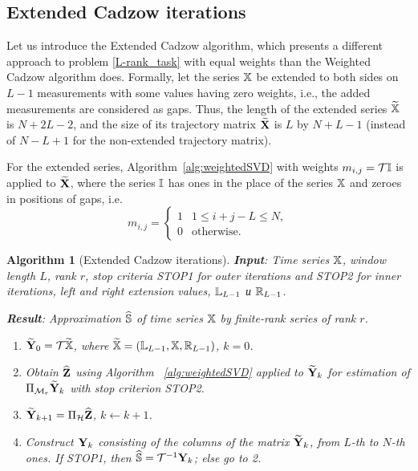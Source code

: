 \documentclass[sii]{ipart}
\newtheorem{algorithm}{Algorithm}
\begin{document}
\subsection{Extended Cadzow iterations}
Let us introduce the Extended Cadzow algorithm, which presents a different approach to problem \eqref{L-rank_task} with equal weights than the Weighted Cadzow algorithm does.
Formally, let the series $\mathbb{X}$ be extended to both sides on $L-1$ measurements with some values having zero weights, i.e., the added measurements are considered as gaps.
Thus, the length of the extended series $\widetilde{\mathbb{X}}$ is $N+2L-2$, and the size of its trajectory matrix $\widetilde{\mathbf{X}}$ is $L$ by $N+L-1$ (instead of $N-L+1$ for the non-extended trajectory matrix).

For the extended series, Algorithm~\ref{alg:weightedSVD} with weights $m_{i,j}=\mathcal{T} \mathbb{I}$ is applied to $\widetilde{\mathbf{X}}$, where the series $\mathbb{I}$ has ones in the place of the series $\mathbb{X}$ and zeroes in positions of gaps, i.e.
\begin{equation*}
m_{i,j} = \begin{cases}
1 & 1 \le i+j-L \le N, \\
0 & \text{otherwise.}
\end{cases}
\end{equation*}

\begin{algorithm}[Extended Cadzow iterations]\label{alg:ECIt}
	\textbf{Input}: Time series $\mathbb{X}$, window length $L$, rank $r$,
	stop criteria STOP1 for outer iterations and STOP2 for inner iterations,
	left and right extension values, $\mathbb{L}_{L-1}$ и $\mathbb{R}_{L-1}$.
	
	\textbf{Result}:
	Approximation $\widehat{\mathbb{S}}$ of time series $\mathbb{X}$ by finite-rank series of rank $r$.
	
	\begin{enumerate}
		\item
		$\widetilde{\mathbf{Y}}_0 = \mathcal{T} \widetilde{\mathbb{X}}$, where $\widetilde{\mathbb{X}}=(\mathbb{L}_{L-1}, \mathbb{X}, \mathbb{R}_{L-1})$, $k=0$.
		\item
		Obtain $\widehat{\mathbf{Z}}$ using Algorithm ~\ref{alg:weightedSVD} applied to $\widetilde{\mathbf{Y}}_k$ for estimation of $\Pi_{\mathcal{M}_r} \widetilde{\mathbf{Y}}_{k}$ with stop criterion STOP2.
		\item
		$\widetilde{\mathbf{Y}}_{k+1} = \Pi_{\mathcal{H}}  \widehat{\mathbf{Z}}$, $k\leftarrow k+1$.
		\item
		Construct $\mathbf{Y}_k$ consisting of the columns of the matrix $\widetilde{\mathbf{Y}}_{k}$, from $L$-th to $N$-th ones. If STOP1, then $\widehat{\mathbb{S}} = \mathcal{T}^{-1} \mathbf{Y}_k$; else go to 2.
	\end{enumerate}
\end{algorithm}
\end{document}
